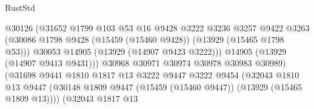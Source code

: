 \begin{lexlean}{RustStd}
\begin{coremodule}
                                            @30126
                                            (@31652
                                              @1799
                                              @103
                                              @53
                                              @16
                                              @9428
                                              @3222
                                              @3236
                                              @3257
                                              @9422
                                              @3263
                                              (@30086
                                                @1798
                                                @9428
                                                (@15459 (@15460 @9428))
                                                (@13929 (@15465 @1798 @53)))
                                              @30053
                                              @14905
                                              (@13929 (@14907 @9423 @3222)))
                                            @14905
                                            (@13929 (@14907 @9413 @9431)))
                                          @30968
                                          @30971
                                          @30974
                                          @30978
                                          @30983
                                          @30989)
                                        (@31698
                                          @9441
                                          @1810
                                          @1817
                                          @13
                                          @3222
                                          @9447
                                          @3222
                                          @9454
                                          (@32043
                                            @1810
                                            @13
                                            @9447
                                            (@30148
                                              @1809
                                              @9447
                                              (@15459 (@15460 @9447))
                                              (@13929 (@15465 @1809 @13))))
                                          (@32043
                                            @1817
                                            @13

\end{coremodule}
\end{lexlean}
